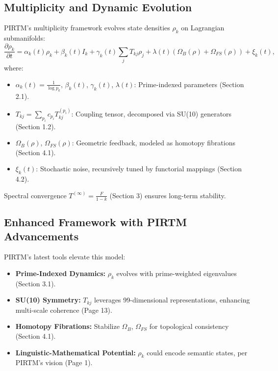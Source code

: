 \documentclass{article}
\theoremstyle{plain}
\begin{document}
\subsection{Multiplicity and Dynamic Evolution}

PIRTM’s multiplicity framework evolves state densities \( \rho_k \) on Lagrangian submanifolds:
\begin{equation}
\frac{\partial \rho_k}{\partial t} = \alpha_k(t) \rho_k + \beta_k(t) I_k + \gamma_k(t) \sum_{j} T_{kj} \rho_j + \lambda(t) \left(\Omega_B(\rho) + \Omega_{FS}(\rho)\right) + \xi_k(t),
\end{equation}
where:
\begin{itemize}
    \item \( \alpha_k(t) = \frac{1}{\log p_k} \), \( \beta_k(t) \), \( \gamma_k(t) \), \( \lambda(t) \): Prime-indexed parameters (Section 2.1).
    \item \( T_{kj} = \sum_{p_i} c_{p_i} T_{kj}^{(p_i)} \): Coupling tensor, decomposed via SU(10) generators (Section 1.2).
    \item \( \Omega_B(\rho) \), \( \Omega_{FS}(\rho) \): Geometric feedback, modeled as homotopy fibrations (Section 4.1).
    \item \( \xi_k(t) \): Stochastic noise, recursively tuned by functorial mappings (Section 4.2).
\end{itemize}
Spectral convergence \( T^{(\infty)} = \frac{F}{1 - k} \) (Section 3) ensures long-term stability.

\subsection{Enhanced Framework with PIRTM Advancements}
PIRTM’s latest tools elevate this model:
\begin{itemize}
    \item \textbf{Prime-Indexed Dynamics:} \( \rho_k \) evolves with prime-weighted eigenvalues (Section 3.1).
    \item \textbf{SU(10) Symmetry:} \( T_{kj} \) leverages 99-dimensional representations, enhancing multi-scale coherence (Page 13).
    \item \textbf{Homotopy Fibrations:} Stabilize \( \Omega_B \), \( \Omega_{FS} \) for topological consistency (Section 4.1).
    \item \textbf{Linguistic-Mathematical Potential:} \( \rho_k \) could encode semantic states, per PIRTM’s vision (Page 1).
\end{itemize}
\end{document}
